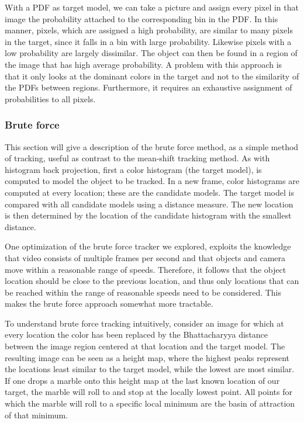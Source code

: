 \documentclass[a4paper,11pt]{article}
\begin{document}
With a PDF as target model, we can take a picture and assign every pixel in that image the probability attached to the corresponding bin in the PDF. In this manner, pixels, which are assigned a high probability, are similar to many pixels in the target, since it falls in a bin with large probability. Likewise pixels with a low probability are largely dissimilar. The object can then be found in a region of the image that has high average probability. A problem with this approach is that it only looks at the dominant colors in the target and not to the similarity of the PDFs between regions. Furthermore, it requires an exhaustive assignment of probabilities to all pixels.

\subsubsection{Brute force}
This section will give a description of the brute force method, as a simple method of tracking, useful as contrast to the mean-shift tracking method. As with histogram back projection, first a color histogram (the target model), is computed to model the object to be tracked. In a new frame, color histograms are computed at every location; these are the candidate models. The target model is compared with all candidate models using a distance measure. The new location is then determined by the location of the candidate histogram with the smallest distance.

One optimization of the brute force tracker we explored, exploits the knowledge that video consists of multiple frames per second and that objects and camera move within a reasonable range of speeds. Therefore, it follows that the object location should be close to the previous location, and thus only locations that can be reached within the range of reasonable speeds need to be considered. This makes the brute force approach somewhat more tractable. 

To understand brute force tracking intuitively, consider an image for which at every location the color has been replaced by the Bhattacharyya distance between the image region centered at that location and the target model. The resulting image can be seen as a height map, where the highest peaks represent the locations least similar to the target model, while the lowest are most similar. If one drops a marble onto this height map at the last known location of our target, the marble will roll to and stop at the locally lowest point. All points for which the marble will roll to a specific local minimum are the basin of attraction of that minimum. 
\end{document}
